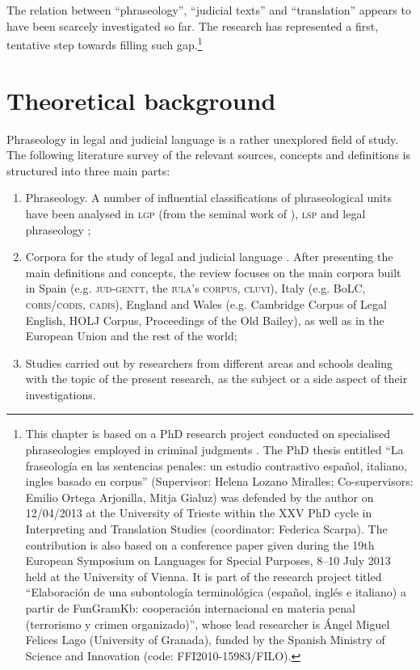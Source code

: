 \documentclass[output=paper]{LSP/langsci}
\begin{document}
The relation between “phraseology”, “judicial texts” and “translation” appears to have been scarcely investigated so far. The research has represented a first, tentative step towards filling such gap.\footnote{This chapter is based on a PhD research project conducted on specialised phraseologies employed in criminal judgments \citep{Pontrandolfo2013a}. The PhD thesis entitled “La fraseología en las sentencias penales: un estudio contrastivo español, italiano, ingles basado en corpus” (Supervisor: Helena Lozano Miralles; Co-supervisors: Emilio Ortega Arjonilla, Mitja Gialuz) was defended by the author on 12/04/2013 at the University of Trieste within the XXV PhD cycle in Interpreting and Translation Studies (coordinator: Federica Scarpa). The contribution is also based on a conference paper given during the 19th European Symposium on Languages for Special Purposes, 8--10 July 2013 held at the University of Vienna. It is part of the research project titled “Elaboración de una subontología terminológica (español, inglés e italiano) a partir de FunGramKb: cooperación internacional en materia penal (terrorismo y crimen organizado)”, whose lead researcher is Ángel Miguel Felices Lago (University of Granada), funded by the Spanish Ministry of Science and Innovation (code: FFI2010-15983/FILO).}

\section{Theoretical background}
Phraseology in legal and judicial language is a rather unexplored field of study. The following literature survey of the relevant sources, concepts and definitions is structured into three main parts:

\begin{enumerate}
\item Phraseology. A number of influential classifications of phraseological units have been analysed in \textsc{lgp} (from the seminal work of \citealt{Benson1986,Corpas1996,Gläser1994/1995,Glaeser1998,Ruiz1997,Cowie1988,Cowie2001,Melchuk1998, Moon1998,Burger1998,Granger2008}), \textsc{lsp}  \citep{Homme2000,Lorente2001,Tercedor1999,Montero2002,Bevilacqua2004,Aguado2007} and legal phraseology \citep {Kjær1990,Kjaer1990b};
\item Corpora for the study of legal and judicial language \citep[see][]{Pontrandolfo2012}. After presenting the main definitions and concepts, the review focuses on the main corpora built in Spain (e.g. \textsc{jud}-\textsc{gentt}, the \textsc{iula}’s \textsc{corpus}, \textsc{cluvi}), Italy (e.g. BoLC, \textsc{coris}/\textsc{codis}, \textsc{cadis}), England and Wales (e.g. Cambridge Corpus of Legal English, HOLJ Corpus, Proceedings of the Old Bailey), as well as in the European Union and the rest of the world;
\item Studies carried out by researchers from different areas and schools dealing with the topic of the present research, as the subject or a side aspect of their investigations.
\end{enumerate}
\end{document}
